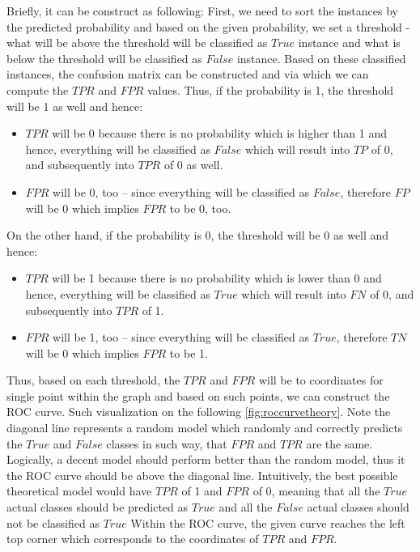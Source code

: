 Briefly, it can be construct as following: First, we need to sort the instances by the predicted probability and based on the given probability, we set a threshold - what will be above the threshold will be classified as $True$ instance and what is below the threshold will be classified as $False$ instance.
Based on these classified instances, the confusion matrix can be constructed and via which we can compute the $TPR$ and $FPR$ values.
Thus, if the probability is 1, the threshold will be 1 as well and hence:
\begin{itemize}\setlength\itemsep{0em}
    \item $TPR$ will be 0 because there is no probability which is higher than 1 and hence, everything will be classified as $False$ which will result into $TP$ of 0, and subsequently into $TPR$ of 0 as well.
	\item $FPR$ will be 0, too – since everything will be classified as $False$, therefore $FP$ will be 0 which implies $FPR$ to be 0, too.
\end{itemize}
On the other hand, if the probability is 0, the threshold will be 0 as well and hence:
\begin{itemize}\setlength\itemsep{0em}
    \item $TPR$ will be 1 because there is no probability which is lower than 0 and hence, everything will be classified as $True$ which will result into $FN$ of 0, and subsequently into $TPR$ of 1.
	\item $FPR$ will be 1, too – since everything will be classified as $True$, therefore $TN$ will be 0 which implies $FPR$ to be 1.
\end{itemize}

Thus, based on each threshold, the $TPR$ and $FPR$ will be to coordinates for single point within the graph and based on such points, we can construct the ROC curve.
Such visualization on the following \autoref{fig:roccurvetheory}.
Note the diagonal line represents a random model which randomly and correctly predicts the $True$ and $False$ classes in such way, that $FPR$ and $TPR$ are the same.
Logically, a decent model should perform better than the random model, thus it the ROC curve should be above the diagonal line.
Intuitively, the best possible theoretical model would have $TPR$ of 1 and $FPR$ of 0, meaning that all the $True$ actual classes should be predicted as $True$ and all the $False$ actual classes should not be classified as $True$
 Within the ROC curve, the given curve reaches the left top corner which corresponds to the coordinates of $TPR$ and $FPR$.

